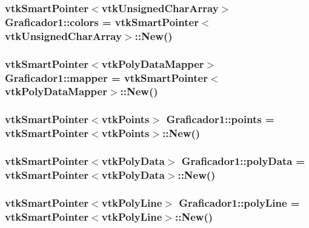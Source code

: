 \subsubsection[{\texorpdfstring{colors}{colors}}]{\setlength{\rightskip}{0pt plus 5cm}vtk\+Smart\+Pointer$<$vtk\+Unsigned\+Char\+Array$>$ Graficador1\+::colors = vtk\+Smart\+Pointer$<$vtk\+Unsigned\+Char\+Array$>$\+::New()}\hypertarget{class_graficador1_a13a6fb8216c7abf42e3e0ce8a39df1b8}{}\label{class_graficador1_a13a6fb8216c7abf42e3e0ce8a39df1b8}
\subsubsection[{\texorpdfstring{mapper}{mapper}}]{\setlength{\rightskip}{0pt plus 5cm}vtk\+Smart\+Pointer$<$vtk\+Poly\+Data\+Mapper$>$ Graficador1\+::mapper = vtk\+Smart\+Pointer$<$vtk\+Poly\+Data\+Mapper$>$\+::New()}\hypertarget{class_graficador1_a1cf22b3f22afd3b46c4e7c2e2d24c5e7}{}\label{class_graficador1_a1cf22b3f22afd3b46c4e7c2e2d24c5e7}
\subsubsection[{\texorpdfstring{points}{points}}]{\setlength{\rightskip}{0pt plus 5cm}vtk\+Smart\+Pointer$<$vtk\+Points$>$ Graficador1\+::points = vtk\+Smart\+Pointer$<$vtk\+Points$>$\+::New()}\hypertarget{class_graficador1_a27673da414293c9c86dffc22f8d18b60}{}\label{class_graficador1_a27673da414293c9c86dffc22f8d18b60}
\subsubsection[{\texorpdfstring{poly\+Data}{polyData}}]{\setlength{\rightskip}{0pt plus 5cm}vtk\+Smart\+Pointer$<$vtk\+Poly\+Data$>$ Graficador1\+::poly\+Data = vtk\+Smart\+Pointer$<$vtk\+Poly\+Data$>$\+::New()}\hypertarget{class_graficador1_a4a2f54d79982b0df5f89bc8ccc94f2ac}{}\label{class_graficador1_a4a2f54d79982b0df5f89bc8ccc94f2ac}
\subsubsection[{\texorpdfstring{poly\+Line}{polyLine}}]{\setlength{\rightskip}{0pt plus 5cm}vtk\+Smart\+Pointer$<$vtk\+Poly\+Line$>$ Graficador1\+::poly\+Line = vtk\+Smart\+Pointer$<$vtk\+Poly\+Line$>$\+::New()}\hypertarget{class_graficador1_a8104c16db84a43865caad8ee2a3956b9}{}\label{class_graficador1_a8104c16db84a43865caad8ee2a3956b9}
